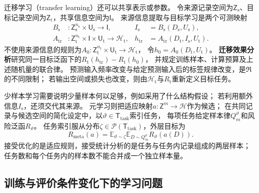 迁移学习（transfer learning）还可以共享表示或参数。
令来源记录空间为$\mathsf Z_{\mathrm s}$、目标记录空间为$\mathsf Z_{\mathrm t}$，共享信息空间为$\mathsf I$。
来源信息提取与目标学习是两个可测映射
\[
  \begin{aligned}
    B_{\mathrm s}&:\mathsf Z_{\mathrm s}^{n_{\mathrm s}}\times\mathsf U_{\mathrm s}\to\mathsf I,
      &I_{\mathrm s}&=B_{\mathrm s}(D_{\mathrm s},U_{\mathrm s}),\\
    A_{\mathrm{tr}}&:\mathsf Z_{\mathrm t}^{n_{\mathrm t}}\times\mathsf I\times\mathsf U_{\mathrm t}\to\mathcal H_{\mathrm t},
      &h_{\mathrm{tr}}&=A_{\mathrm{tr}}(D_{\mathrm t},I_{\mathrm s},U_{\mathrm t}).
  \end{aligned}
\]
不使用来源信息的规则为$A_0:\mathsf Z_{\mathrm t}^{n_{\mathrm t}}\times\mathsf U_{\mathrm t}\to\mathcal H_{\mathrm t}$，
令$h_0=A_0(D_{\mathrm t},U_{\mathrm t})$。
\textbf{迁移效果分析}研究同一目标泛函下的$R_{\mathrm t}(h_{\mathrm{tr}})-R_{\mathrm t}(h_0)$，
并规定训练样本、计算预算及上述随机量的联合律。
预测输入频率改变与给定预测输入后的标签规律改变，是$\mathfrak R$的不同限制；
若输出空间或损失也改变，则由$\mathcal H_{\mathrm t}$与$R_{\mathrm t}$重新定义目标任务。

少样本学习需要说明少量样本何以足够，例如采用了什么结构假设；
若利用额外信息$I_{\mathrm s}$，还须交代其来源。
元学习则把适应映射$a:\mathsf Z^m\to\mathcal H$作为候选；
在共同记录与候选空间的简化设定中，以$\vartheta\in\mathsf T_{\mathrm{task}}$索引任务，
每项任务给定样本律$Q_m^{\vartheta}$和风险泛函$R_{\vartheta}$。
任务索引服从分布$\zeta\in\mathcal P(\mathsf T_{\mathrm{task}})$，外层目标为
\[
  R_{\mathrm{meta}}(a)=
  \mathbb E_{\vartheta\sim\zeta}
  \mathbb E_{D\sim Q_m^{\vartheta}}R_{\vartheta}(a(D)).
\]
接受优化的是适应规则，接受统计分析的是任务与任务内记录组成的两层样本；
任务数和每个任务内的样本数不能合并成一个独立样本量。

\subsection{训练与评价条件变化下的学习问题}
\label{sec:future-ml-changing-conditions}

